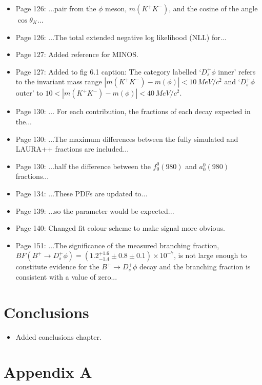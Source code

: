 \documentclass[12pt]{article}
\begin{document}
\begin{itemize}


\item Page 126: ...pair {\color{red}from} the $\phi$ meson, $m(K^+K^-)$, and the cosine of {\color{red}the} angle $\cos\theta_{K}$...
\item Page 126: ...The total extended {\color{red}negative log likelihood} (NLL) for...
\item Page 127: Added reference for MINOS.
\item Page 127: Added to fig 6.1 caption: {\color{red}The category labelled `$D_s^+\phi$ inner' refers to the invariant mass range $|m(K^+K^-)-m(\phi)|<10\,MeV/c^2$ and `$D_s^+\phi$  outer' to $10<|m(K^+K^-)-m(\phi)|<40\,MeV/c^2$.}
\item Page 130: ... {\color{red}For each contribution, the fractions of each decay} expected in the...
\item Page 130: ...The maximum differences {\color{red}between the fully simulated and LAURA++ fractions} are included...
\item Page 130: ...half the difference  {\color{red}between the $f_{0}^{0}(980)$ and $a_{0}^{0}(980)$ fractions}... 
\item Page 134: ...These PDFs are {\color{red}updated} to...
\item Page 139: ...so the {\color{red}parameter} would be expected...
\item Page 140: Changed fit colour scheme to make signal more obvious.
\item Page 151: ...The {\color{red}significance of} the measured branching fraction, $BF(B^+\rightarrow D_s^+\phi) = (1.2^{+1.6}_{-1.4} \pm 0.8  \pm 0.1)\times 10^{-7}$, is {\color{red}not large enough to constitute evidence} for the $B^+\rightarrow D_s^+\phi$ decay and {\color{red}the branching fraction is consistent with a value of zero}...

\end{itemize}
\section{Conclusions}

\begin{itemize}
\item Added conclusions chapter.

\end{itemize}
\section{Appendix A}
\end{document}
